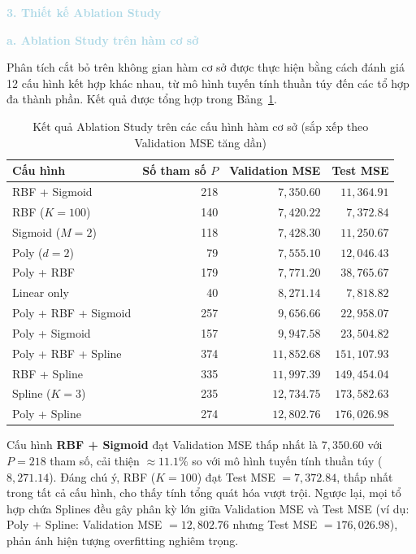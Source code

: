 \noindent\textcolor{lightblue}{\textbf{3. Thiết kế Ablation Study}}

\noindent\textcolor{lightblue}{\textbf{a. Ablation Study trên hàm cơ sở}}

Phân tích cắt bỏ trên không gian hàm cơ sở được thực hiện bằng cách
đánh giá 12 cấu hình kết hợp khác nhau, từ mô hình tuyến tính thuần túy
đến các tổ hợp đa thành phần. Kết quả được tổng hợp trong
Bảng~\ref{tab:basis_ablation}.

\begin{table}[H]
\centering
\caption{Kết quả Ablation Study trên các cấu hình hàm cơ sở
(sắp xếp theo Validation MSE tăng dần)}
\label{tab:basis_ablation}
\begin{tabular}{lrrr}
\hline
\textbf{Cấu hình} & \textbf{Số tham số $P$}
  & \textbf{Validation MSE} & \textbf{Test MSE} \\
\hline
RBF + Sigmoid        & 218 & $7{,}350.60$  & $11{,}364.91$ \\
RBF ($K=100$)        & 140 & $7{,}420.22$  & $7{,}372.84$  \\
Sigmoid ($M=2$)      & 118 & $7{,}428.30$  & $11{,}250.67$ \\
Poly ($d=2$)         &  79 & $7{,}555.10$  & $12{,}046.43$ \\
Poly + RBF           & 179 & $7{,}771.20$  & $38{,}765.67$ \\
Linear only          &  40 & $8{,}271.14$  & $7{,}818.82$  \\
Poly + RBF + Sigmoid & 257 & $9{,}656.66$  & $22{,}958.07$ \\
Poly + Sigmoid       & 157 & $9{,}947.58$  & $23{,}504.82$ \\
Poly + RBF + Spline  & 374 & $11{,}852.68$ & $151{,}107.93$ \\
RBF + Spline         & 335 & $11{,}997.39$ & $149{,}454.04$ \\
Spline ($K=3$)       & 235 & $12{,}734.75$ & $173{,}582.63$ \\
Poly + Spline        & 274 & $12{,}802.76$ & $176{,}026.98$ \\
\hline
\end{tabular}
\end{table}

Cấu hình \textbf{RBF + Sigmoid} đạt Validation MSE thấp nhất là
$7{,}350.60$ với $P=218$ tham số, cải thiện $\approx 11.1\%$ so với
mô hình tuyến tính thuần túy ($8{,}271.14$). Đáng chú ý, RBF ($K=100$)
đạt Test MSE $= 7{,}372.84$, thấp nhất trong tất cả cấu hình, cho thấy
tính tổng quát hóa vượt trội. Ngược lại, mọi tổ hợp chứa Splines đều
gây phân kỳ lớn giữa Validation MSE và Test MSE (ví dụ: Poly + Spline:
Validation MSE $= 12{,}802.76$ nhưng Test MSE $= 176{,}026.98$),
phản ánh hiện tượng overfitting nghiêm trọng.

